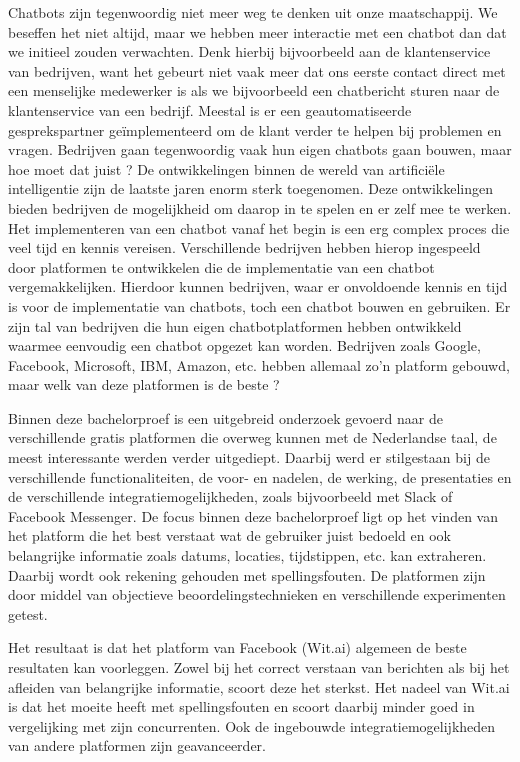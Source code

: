 Chatbots zijn tegenwoordig niet meer weg te denken uit onze maatschappij. We beseffen het niet altijd, maar we hebben meer interactie met een chatbot dan dat we initieel zouden verwachten. Denk hierbij bijvoorbeeld aan de klantenservice van bedrijven, want het gebeurt niet vaak meer dat ons eerste contact direct met een menselijke medewerker is als we bijvoorbeeld een chatbericht sturen naar de klantenservice van een bedrijf. Meestal is er een geautomatiseerde gesprekspartner geïmplementeerd om de klant verder te helpen bij problemen en vragen. Bedrijven gaan tegenwoordig vaak hun eigen chatbots gaan bouwen, maar hoe moet dat juist ? De ontwikkelingen binnen de wereld van artificiële intelligentie zijn de laatste jaren enorm sterk toegenomen. Deze ontwikkelingen bieden bedrijven de mogelijkheid om daarop in te spelen en er zelf mee te werken. Het implementeren van een chatbot vanaf het begin is een erg complex proces die veel tijd en kennis vereisen. Verschillende bedrijven hebben hierop ingespeeld door platformen te ontwikkelen die de implementatie van een chatbot vergemakkelijken. Hierdoor kunnen bedrijven, waar er onvoldoende kennis en tijd is voor de implementatie van chatbots, toch een chatbot bouwen en gebruiken. Er zijn tal van bedrijven die hun eigen chatbotplatformen hebben ontwikkeld waarmee eenvoudig een chatbot opgezet kan worden. Bedrijven zoals Google, Facebook, Microsoft, IBM, Amazon, etc. hebben allemaal zo’n platform gebouwd, maar welk van deze platformen is de beste ?

Binnen deze bachelorproef is een uitgebreid onderzoek gevoerd naar de verschillende gratis platformen die overweg kunnen met de Nederlandse taal, de meest interessante werden verder uitgediept. Daarbij werd er stilgestaan bij de verschillende functionaliteiten, de voor- en nadelen, de werking, de presentaties en de verschillende integratiemogelijkheden, zoals bijvoorbeeld met Slack of Facebook Messenger. De focus binnen deze bachelorproef ligt op het vinden van het platform die het best verstaat wat de gebruiker juist bedoeld en ook belangrijke informatie zoals datums, locaties, tijdstippen, etc. kan extraheren. Daarbij wordt ook rekening gehouden met spellingsfouten. De platformen zijn door middel van objectieve beoordelingstechnieken en verschillende experimenten getest. 

Het resultaat is dat het platform van Facebook (Wit.ai) algemeen de beste resultaten kan voorleggen. Zowel bij het correct verstaan van berichten als bij het afleiden van belangrijke informatie, scoort deze het sterkst. Het nadeel van Wit.ai is dat het moeite heeft met spellingsfouten en scoort daarbij minder goed in vergelijking met zijn concurrenten. Ook de ingebouwde integratiemogelijkheden van andere platformen zijn geavanceerder.

